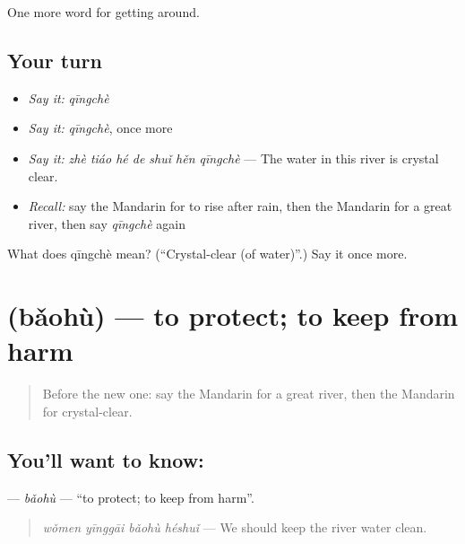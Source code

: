 \begin{grammarlens}[title={What you've built}]
One more word for getting around.
\end{grammarlens}

\subsection*{Your turn}
\begin{itemize}
\raggedright
  \item \emph{Say it:} \emph{qīngchè}
  \item \emph{Say it:} \emph{qīngchè}, once more
  \item \emph{Say it:} \emph{zhè tiáo hé de shuǐ hěn qīngchè} — The water in this river is crystal clear.
  \item \emph{Recall:} say the Mandarin for to rise after rain, then the Mandarin for a great river, then say \emph{qīngchè} again
\end{itemize}

\begin{tcolorbox}[breakable,colback=teal!4,colframe=teal!35!black,title={Before you move on}]
What does qīngchè mean? (\textquotedblleft{}Crystal-clear (of water)\textquotedblright{}.) Say it once more.
\end{tcolorbox}
\section[\texorpdfstring{\zh{保护} (bǎohù)}{保护 (bǎohù)}]{ (bǎohù) — to protect; to keep from harm}

\label{lesson:ZH-C443-baohu}



\begin{quote}
Before the new one: say the Mandarin for a great river, then the Mandarin for crystal-clear.
\end{quote}

\subsection*{You'll want to know: }
\textbf{} — \emph{bǎohù} — \textquotedblleft{}to protect; to keep from harm\textquotedblright{}.

\begin{quote}
\textbf{} \emph{wǒmen yīnggāi bǎohù héshuǐ} — We should keep the river water clean.
\end{quote}

